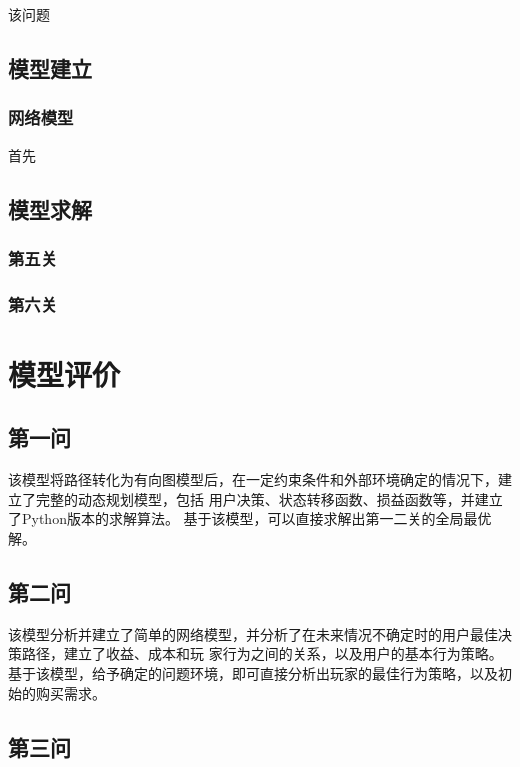 \documentclass[withoutpreface,bwprint]{cumcmthesis} %
\begin{document}
该问题


\subsection{模型建立}

\subsubsection{网络模型}

首先

\subsection{模型求解}

\subsubsection{第五关}


\subsubsection{第六关}






\section{模型评价}
\label{sec:simulate}

\subsection{第一问}

该模型将路径转化为有向图模型后，在一定约束条件和外部环境确定的情况下，建立了完整的动态规划模型，包括
用户决策、状态转移函数、损益函数等，并建立了Python版本的求解算法。
基于该模型，可以直接求解出第一二关的全局最优解。

\subsection{第二问}

该模型分析并建立了简单的网络模型，并分析了在未来情况不确定时的用户最佳决策路径，建立了收益、成本和玩
家行为之间的关系，以及用户的基本行为策略。
基于该模型，给予确定的问题环境，即可直接分析出玩家的最佳行为策略，以及初始的购买需求。

\subsection{第三问}
\end{document}
